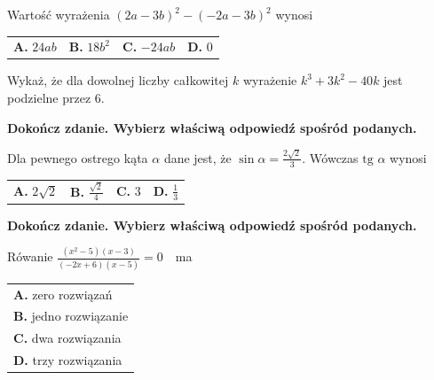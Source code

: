 \documentclass[12pt,a4paper]{article}
\theoremstyle{break}
\begin{document}
	Wartość wyrażenia $(2a-3b)^2-(-2a-3b)^2$ wynosi
	
	\vspace{0.5cm}
	\begin{tabular}{p{3.5cm} p{3.5cm} p{3.5cm} p{3.5cm}}
		\textbf{A. }$24ab$&
		\textbf{B. }$18b^2$&
		\textbf{C. }$-24ab$&
		\textbf{D. }$0$\\
	\end{tabular}


	\begin{zad}[0-2]
		Wykaż, że dla dowolnej liczby całkowitej $k$ wyrażenie $k^3+3k^2-40k$ jest podzielne przez 6.
	\end{zad} 

	
	\begin{zad}[0-1]
		\textbf{Dokończ zdanie. Wybierz właściwą odpowiedź spośród podanych.}
	\end{zad} 
	
	Dla pewnego ostrego kąta $\alpha$ dane jest, że $\sin\alpha = \frac{2\sqrt{2}}{3}$. Wówczas $\text{tg }\alpha$ wynosi
	
	\vspace{0.5cm}
	\begin{tabular}{p{3.5cm} p{3.5cm} p{3.5cm} p{3.5cm}}
		\textbf{A. }$2\sqrt{2}$&
		\textbf{B. }$\frac{\sqrt{2}}{4}$&
		\textbf{C. }$3$&
		\textbf{D. }$\frac{1}{3}$\\
	\end{tabular}

	\newpage
	\begin{zad}[0-1]
		\textbf{Dokończ zdanie. Wybierz właściwą odpowiedź spośród podanych.}
	\end{zad} 
	
	Rówanie \large$\frac{(x^2-5)(x-3)}{(-2x+6)(x-5)}$$=0\quad$\normalsize ma 
	
	\vspace{0.5cm}
	\begin{tabular}{p{14cm}}
		\textbf{A. }zero rozwiązań\\
		\textbf{B. }jedno rozwiązanie\\
		\textbf{C. }dwa rozwiązania\\
		\textbf{D. }trzy rozwiązania\\
	\end{tabular}

	
\end{document}
